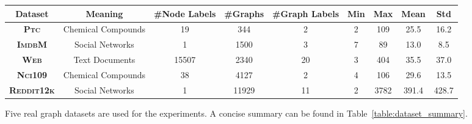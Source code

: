 \documentclass{article}
\newcommand{\ptc}{\textsc{Ptc}\xspace}
\newcommand{\imdb}{\textsc{ImdbM}\xspace}
\newcommand{\web}{\textsc{Web}\xspace}
\newcommand{\nci}{\textsc{Nci109}\xspace}
\newcommand{\reddit}{\textsc{Reddit12k}\xspace}
\begin{document}
\begin{table*}
\begin{tabular}
{ccccccccc} \hline
\textbf{Dataset} & \textbf{Meaning} & \textbf{\#Node Labels} & \textbf{\#Graphs} & \textbf{\#Graph Labels} & \textbf{Min} & \textbf{Max} & \textbf{Mean} & \textbf{Std}\\ \hline
\textbf{\ptc} & Chemical Compounds & 19 & 344 & 2 & 2 & 109 & 25.5 & 16.2 \\
\textbf{\imdb} & Social Networks & 1 & 1500 & 3 & 7 & 89 & 13.0 & 8.5 \\
\textbf{\web} & Text Documents & 15507 & 2340 & 20 & 3 & 404 & 35.5 & 37.0 \\
\textbf{\nci} & Chemical Compounds & 38 & 4127 & 2 & 4 & 106 & 29.6 & 13.5 \\
\textbf{\reddit} & Social Networks & 1 & 11929 & 11 & 2 & 3782 & 391.4 & 428.7 \\
\hline
\end{tabular}
\centering
\caption{Statistics of datasets. ``Min'', ``Max'', ``Mean'', and ``Std'' refer to the minimum, maximum, mean, and standard deviation of the graph sizes (number of nodes), respectively.}
\label{table:dataset_summary}
\end{table*}

Five real graph datasets are used for the experiments. A concise summary can be found in Table~\ref{table:dataset_summary}.
\end{document}
